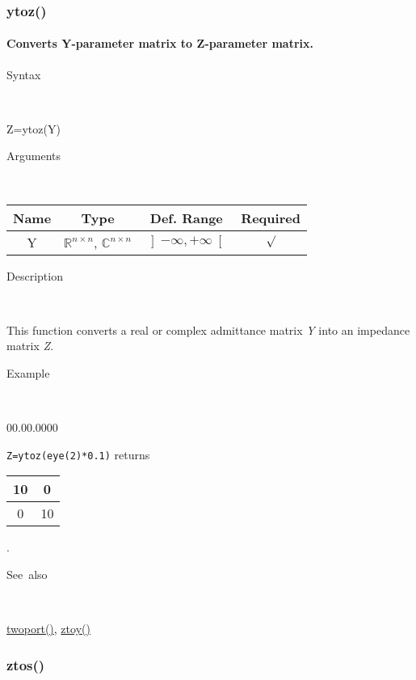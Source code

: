 \newpage
\subsubsection*{\hypertarget{ytoz}{}{\Large ytoz()}}


\paragraph{\label{par:ytoz}Converts Y-parameter matrix to Z-parameter matrix.}

\begin{description}
\item [Syntax]~
\end{description}
Z=ytoz(Y)

\begin{description}
\item [Arguments]~
\end{description}
\begin{tabular}{|c|c|c|c|}
\hline 
Name&
Type&
Def. Range&
Required\tabularnewline
\hline
\hline 
Y&
$\mathbb{R}^{n\times n}$, $\mathbb{C}^{n\times n}$&
$\left]-\infty,+\infty\right[$&
$\surd$\tabularnewline
\hline
\end{tabular}

\begin{description}
\item [Description]~
\end{description}
This function converts a real or complex admittance matrix \textit{Y}
into an impedance matrix \textit{Z}. 

\begin{description}
\item [Example]~
\end{description}
\begin{lyxlist}{00.00.0000}
\item [\texttt{Z=ytoz(eye(2){*}0.1)}]returns \begin{tabular}{|c|c|}
\hline 
10&
0\tabularnewline
\hline
0&
10\tabularnewline
\hline
\end{tabular}.
\end{lyxlist}
\begin{description}
\item [See~also]~
\end{description}
\textcolor{blue}{\hyperlink{twoport}{twoport()}}\textcolor{black}{,}
\textcolor{blue}{\hyperlink{ztoy}{ztoy()}}


\newpage
\subsubsection*{\hypertarget{ztos}{}{\Large ztos()}}


